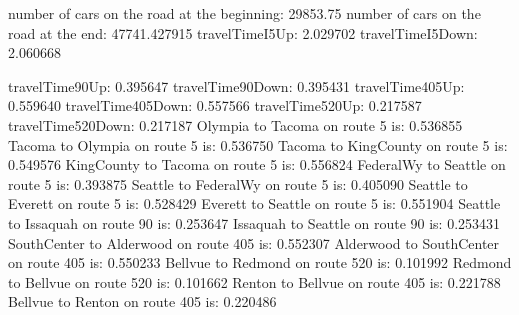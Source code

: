number of cars on the road at the beginning:
29853.75
number of cars on the road at the end:
47741.427915
travelTimeI5Up: 2.029702
travelTimeI5Down: 2.060668

travelTime90Up: 0.395647
travelTime90Down: 0.395431
travelTime405Up: 0.559640
travelTime405Down: 0.557566
travelTime520Up: 0.217587
travelTime520Down: 0.217187
Olympia to Tacoma on route 5 is: 0.536855
Tacoma to Olympia on route 5 is: 0.536750
Tacoma to KingCounty on route 5 is: 0.549576
KingCounty to Tacoma on route 5 is: 0.556824
FederalWy to Seattle on route 5 is: 0.393875
Seattle to FederalWy on route 5 is: 0.405090
Seattle to Everett on route 5 is: 0.528429
Everett to Seattle on route 5 is: 0.551904
Seattle to Issaquah on route 90 is: 0.253647
Issaquah to Seattle on route 90 is: 0.253431
SouthCenter to Alderwood on route 405 is: 0.552307
Alderwood to SouthCenter on route 405 is: 0.550233
Bellvue to Redmond on route 520 is: 0.101992
Redmond to Bellvue on route 520 is: 0.101662
Renton to Bellvue on route 405 is: 0.221788
Bellvue to Renton on route 405 is: 0.220486